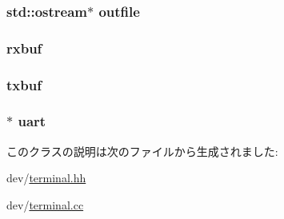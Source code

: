 \label{classTerminal_a7106e2abc437ad981830d14176d15f09}
\hypertarget{classTerminal_a15518d8416f4c0090ede0c9699a7bef8}{
\subsubsection[{outfile}]{\setlength{\rightskip}{0pt plus 5cm}std::ostream$\ast$ {\bf outfile}}}
\label{classTerminal_a15518d8416f4c0090ede0c9699a7bef8}
\hypertarget{classTerminal_af804c397682f3186a1fdd9919d93dea1}{
\subsubsection[{rxbuf}]{ {\bf rxbuf}}}
\label{classTerminal_af804c397682f3186a1fdd9919d93dea1}
\hypertarget{classTerminal_a49636a97ed2e363e47ffc2f0e2899b66}{
\subsubsection[{txbuf}]{ {\bf txbuf}}}
\label{classTerminal_a49636a97ed2e363e47ffc2f0e2899b66}
\hypertarget{classTerminal_a367b890cb271162bf5e8d879e09192cf}{
\subsubsection[{uart}]{$\ast$ {\bf uart}}}
\label{classTerminal_a367b890cb271162bf5e8d879e09192cf}


このクラスの説明は次のファイルから生成されました:\begin{DoxyCompactItemize}
\item 
dev/\hyperlink{terminal_8hh}{terminal.hh}\item 
dev/\hyperlink{terminal_8cc}{terminal.cc}\end{DoxyCompactItemize}
